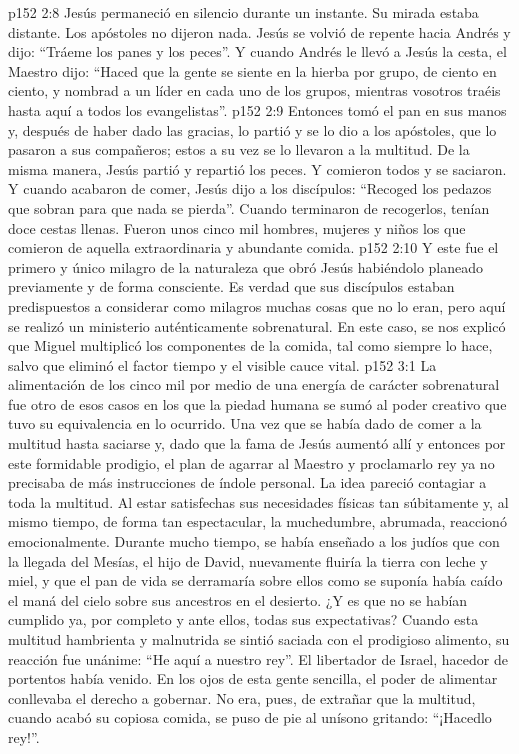 \vs p152 2:8 Jesús permaneció en silencio durante un instante. Su mirada estaba distante. Los apóstoles no dijeron nada. Jesús se volvió de repente hacia Andrés y dijo: “Tráeme los panes y los peces”. Y cuando Andrés le llevó a Jesús la cesta, el Maestro dijo: “Haced que la gente se siente en la hierba por grupo, de ciento en ciento, y nombrad a un líder en cada uno de los grupos, mientras vosotros traéis hasta aquí a todos los evangelistas”.
\vs p152 2:9 Entonces tomó el pan en sus manos y, después de haber dado las gracias, lo partió y se lo dio a los apóstoles, que lo pasaron a sus compañeros; estos a su vez se lo llevaron a la multitud. De la misma manera, Jesús partió y repartió los peces. Y comieron todos y se saciaron. Y cuando acabaron de comer, Jesús dijo a los discípulos: “Recoged los pedazos que sobran para que nada se pierda”. Cuando terminaron de recogerlos, tenían doce cestas llenas. Fueron unos cinco mil hombres, mujeres y niños los que comieron de aquella extraordinaria y abundante comida.
\vs p152 2:10 \pc Y este fue el primero y único milagro de la naturaleza que obró Jesús habiéndolo planeado previamente y de forma consciente. Es verdad que sus discípulos estaban predispuestos a considerar como milagros muchas cosas que no lo eran, pero aquí se realizó un ministerio auténticamente sobrenatural. En este caso, se nos explicó que Miguel multiplicó los componentes de la comida, tal como siempre lo hace, salvo que eliminó el factor tiempo y el visible cauce vital.
\vs p152 3:1 La alimentación de los cinco mil por medio de una energía de carácter sobrenatural fue otro de esos casos en los que la piedad humana se sumó al poder creativo que tuvo su equivalencia en lo ocurrido. Una vez que se había dado de comer a la multitud hasta saciarse y, dado que la fama de Jesús aumentó allí y entonces por este formidable prodigio, el plan de agarrar al Maestro y proclamarlo rey ya no precisaba de más instrucciones de índole personal. La idea pareció contagiar a toda la multitud. Al estar satisfechas sus necesidades físicas tan súbitamente y, al mismo tiempo, de forma tan espectacular, la muchedumbre, abrumada, reaccionó emocionalmente. Durante mucho tiempo, se había enseñado a los judíos que con la llegada del Mesías, el hijo de David, nuevamente fluiría la tierra con leche y miel, y que el pan de vida se derramaría sobre ellos como se suponía había caído el maná del cielo sobre sus ancestros en el desierto. ¿Y es que no se habían cumplido ya, por completo y ante ellos, todas sus expectativas? Cuando esta multitud hambrienta y malnutrida se sintió saciada con el prodigioso alimento, su reacción fue unánime: “He aquí a nuestro rey”. El libertador de Israel, hacedor de portentos había venido. En los ojos de esta gente sencilla, el poder de alimentar conllevaba el derecho a gobernar. No era, pues, de extrañar que la multitud, cuando acabó su copiosa comida, se puso de pie al unísono gritando: “¡Hacedlo rey!”.
